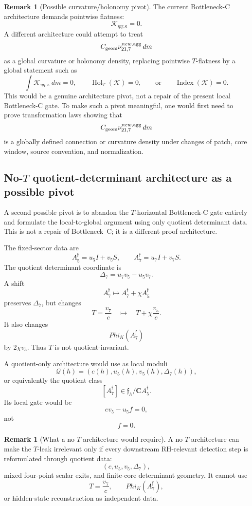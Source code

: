 \documentclass[11pt,a4paper]{amsart}
\def\Phi{Phi}%
\def\new{new}%
\theoremstyle{plain}
\theoremstyle{definition}
\newtheorem{remark}[theorem]{Remark}
\newcommand{\new}{\mathrm{new}}
\begin{document}
\begin{remark}[Possible curvature/holonomy pivot]
\label{rem:possible-curvature-holonomy-pivot}
The current Bottleneck-C architecture demands pointwise flatness:
\[
\mathcal K_{\eta\eta;\kappa}=0.
\]
A different architecture could attempt to treat
\[
C_{\rm geom}\nu_{21,7}^{\new,\mathrm{agg}}\,dm
\]
as a global curvature or holonomy density, replacing pointwise \(T\)-flatness
by a global statement such as
\[
\int \mathcal K_{\eta\eta;\kappa}\,dm=0,
\qquad
\operatorname{Hol}_T(\mathcal K)=0,
\qquad
\text{or}\qquad
\operatorname{Index}(\mathcal K)=0.
\]
This would be a genuine architecture pivot, not a repair of the present local
Bottleneck-C gate.  To make such a pivot meaningful, one would first need to
prove transformation laws showing that
\[
C_{\rm geom}\nu_{21,7}^{\new,\mathrm{agg}}\,dm
\]
is a globally defined connection or curvature density under changes of patch,
core window, source convention, and normalization.
\end{remark}

\subsection{No-\(T\) quotient-determinant architecture as a possible pivot}
\label{subsec:no-t-quotient-determinant-architecture}

A second possible pivot is to abandon the \(T\)-horizontal Bottleneck-C gate
entirely and formulate the local-to-global argument using only quotient
determinant data.  This is not a repair of Bottleneck~C; it is a different
proof architecture.

The fixed-sector data are
\[
A_5^{\mathfrak f}=u_5I+v_5S,
\qquad
A_7^{\mathfrak f}=u_7I+v_7S.
\]
The quotient determinant coordinate is
\[
\Delta_7=u_7v_5-u_5v_7.
\]
A shift
\[
A_7^{\mathfrak f}
\mapsto
A_7^{\mathfrak f}+\chi A_5^{\mathfrak f}
\]
preserves \(\Delta_7\), but changes
\[
T=\frac{v_7}{c}
\quad\mapsto\quad
T+\chi\frac{v_5}{c}.
\]
It also changes
\[
\Phi_K(A_7^{\mathfrak f})
\]
by \(2\chi v_5\).  Thus \(T\) is not quotient-invariant.

A quotient-only architecture would use as local moduli
\[
\mathcal Q(h)
=
\left(
c(h),u_5(h),v_5(h),\Delta_7(h)
\right),
\]
or equivalently the quotient class
\[
[A_7^{\mathfrak f}]
\in
\mathfrak f_h/\mathbf C A_5^{\mathfrak f}.
\]
Its local gate would be
\[
ev_5-u_5f=0,
\]
not
\[
f=0.
\]

\begin{remark}[What a no-\(T\) architecture would require]
\label{rem:no-t-architecture-requirements}
A no-\(T\) architecture can make the \(T\)-leak irrelevant only if every
downstream RH-relevant detection step is reformulated through quotient data:
\[
(c,u_5,v_5,\Delta_7),
\]
mixed four-point scalar exits, and finite-core determinant geometry.  It
cannot use
\[
T=\frac{v_7}{c},
\qquad
\Phi_K(A_7^{\mathfrak f}),
\]
or hidden-state reconstruction as independent data.
\end{remark}
\end{document}
